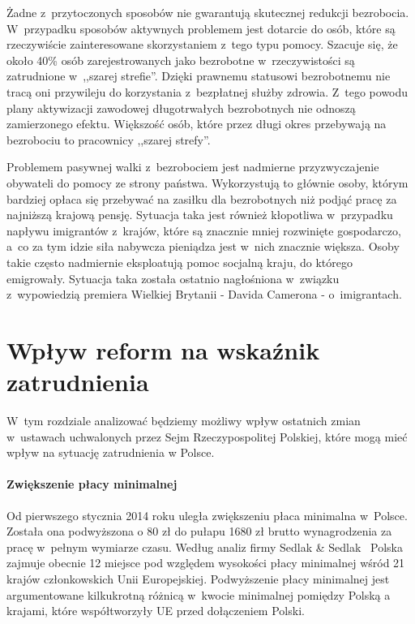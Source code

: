 \documentclass[12pt]{article}
\begin{document}
   Żadne z~przytoczonych sposobów nie gwarantują skutecznej redukcji bezrobocia. W~przypadku sposobów aktywnych problemem jest dotarcie do osób, które są rzeczywiście zainteresowane skorzystaniem z~tego typu pomocy. Szacuje się, że około 40\% osób zarejestrowanych jako bezrobotne w~rzeczywistości są zatrudnione w~,,szarej strefie''. Dzięki prawnemu statusowi bezrobotnemu nie tracą oni przywileju do korzystania z~bezpłatnej służby zdrowia. Z~tego powodu plany aktywizacji zawodowej długotrwałych bezrobotnych nie odnoszą zamierzonego efektu. Większość osób, które przez długi okres przebywają na bezrobociu to pracownicy ,,szarej strefy''.
   
   Problemem pasywnej walki z~bezrobociem jest nadmierne przyzwyczajenie obywateli do pomocy ze strony państwa. Wykorzystują to głównie osoby, którym bardziej opłaca się przebywać na zasiłku dla bezrobotnych niż podjąć pracę za najniższą krajową pensję. Sytuacja taka jest również kłopotliwa w~przypadku napływu imigrantów z~krajów, które są znacznie mniej rozwinięte gospodarczo, a~co za tym idzie siła nabywcza pieniądza jest w~nich znacznie większa. Osoby takie często nadmiernie eksploatują pomoc socjalną kraju, do którego emigrowały. Sytuacja taka została ostatnio nagłośniona w~związku z~wypowiedzią premiera Wielkiej Brytanii - Davida Camerona - o~imigrantach.
    
    \section*{Wpływ reform na wskaźnik zatrudnienia}
    
    W~tym rozdziale analizować będziemy możliwy wpływ ostatnich zmian w~ustawach uchwalonych przez Sejm Rzeczypospolitej Polskiej, które mogą mieć wpływ na sytuację zatrudnienia w Polsce.
        
    \paragraph{Zwiększenie płacy minimalnej} 
    
    Od pierwszego stycznia 2014 roku uległa zwiększeniu płaca minimalna w~Polsce. Została ona podwyższona o 80 zł do pułapu 1680 zł brutto wynagrodzenia za pracę w~pełnym wymiarze czasu. Według analiz firmy Sedlak \& Sedlak~\cite{sedlak} Polska zajmuje obecnie 12 miejsce pod względem wysokości płacy minimalnej wśród 21 krajów członkowskich Unii Europejskiej. Podwyższenie płacy minimalnej jest argumentowane kilkukrotną różnicą w~kwocie minimalnej pomiędzy Polską a krajami, które współtworzyły UE przed dołączeniem Polski. 
    
\end{document}
